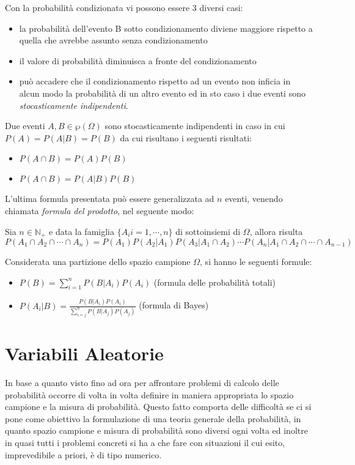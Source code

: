 \documentclass[a4paper,12pt, oneside]{book}
\newcommand{\numberset}{\mathbb}
\newcommand{\N}{\numberset{N}}
\begin{document}
Con la probabilità condizionata vi possono essere 3 diversi casi:
\begin{itemize}
    \item la probabilità dell'evento B sotto condizionamento diviene maggiore rispetto a quella 
          che avrebbe assunto senza condizionamento
    \item il valore di probabilità diminuisca a fronte del condizionamento
    \item può accadere che il condizionamento rispetto ad un evento non inficia in alcun modo la probabilità di 
        un altro evento ed in sto caso i due eventi sono \emph{stocasticamente indipendenti}.
\end{itemize}
Due eventi $A, B \in \wp(\Omega)$ sono stocasticamente indipendenti in caso in cui $P(A) = P(A | B) = P(B)$
da cui risultano i seguenti risultati:
\begin{itemize}
    \item $P(A \cap B) = P(A) P(B)$
    \item $P(A \cap B) = P(A | B) P(B)$
\end{itemize}
L'ultima formula presentata può essere generalizzata ad $n$ eventi, venendo chiamata 
\emph{formula del prodotto}, nel seguente modo:
\begin{definizione}
    Sia $n \in \N _+$ e data la famiglia $\{A_i i=1, \cdots, n\}$ di sottoinsiemi di $\Omega$, allora risulta
    \[P(A_1 \cap A_2 \cap \cdots \cap A_n) = P(A_1) P(A_2 | A_1) P(A_3 | A_1 \cap A_2) \cdots 
                                             P(A_n | A_1 \cap A_2 \cap \cdots \cap A_{n-1}) \]
\end{definizione}
Considerata una partizione dello spazio campione $\Omega$, si hanno le seguenti formule:
\begin{itemize}
    \item $P(B) = \sum_{i = 1} ^ n P(B | A_i) P(A_i)$ (formula delle probabilità totali)
    \item $P(A_i | B) = \frac{P(B | A_i) P(A_i)}{\sum_{i = j} ^ n P(B | A_j) P(A_j)}$ (formula di Bayes)
\end{itemize}

\section{Variabili Aleatorie}
In base a quanto visto fino ad ora per affrontare problemi di calcolo delle probabilità occorre di volta
in volta definire in maniera appropriata lo spazio campione e la misura di probabilità.\newline
Questo fatto comporta delle difficoltà se ci si pone come obiettivo la formulazione di una teoria
generale della probabilità, in quanto spazio campione e misura di probabilità sono diversi ogni volta ed
inoltre in quasi tutti i problemi concreti si ha a che fare con situazioni il cui esito, 
imprevedibile a priori, è di tipo numerico.
\end{document}
